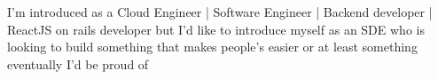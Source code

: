 \par{
I'm introduced as a Cloud Engineer | Software Engineer | Backend developer | ReactJS on rails developer but I'd like to introduce myself as an SDE who is looking to build something that makes people's easier or at least something eventually I'd be proud of
}

